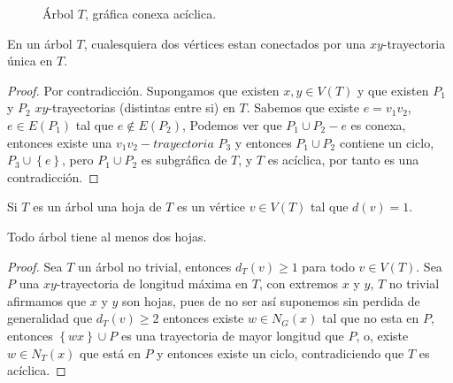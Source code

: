 \begin{figure}[ht]
    \begin{center}
    \end{center}\caption{\'Arbol $T$, gr\'afica conexa ac\'iclica.}
\end{figure}

\begin{teorema}
    \label{ATU}
    En un \'arbol $T$, cualesquiera dos v\'ertices estan conectados por una $xy$-trayectoria \'unica en $T$.
\end{teorema}

\begin{proof}
    Por contradicci\'on.
    Supongamos que existen $x,y \in V(T)$ y que existen $P_1$ y $P_2$ $xy$-trayectorias (distintas entre si) en $T$.
    Sabemos que existe $e= v_1v_2$,  $e \in E(P_1)$ tal que $e \notin E(P_2)$, Podemos ver que $P_1 \cup P_2-e$ es
    conexa, entonces existe una $v_1v_2-trayectoria$ $P_3$ y entonces $P_1 \cup P_2$ contiene un ciclo, $P_3 \cup
    \left\{e\right\}$, pero $P_1 \cup P_2$ es subgr\'afica de $T$, y $T$ es ac\'iclica, por tanto es una
    contradicci\'on.
\end{proof}

Si $T$ es un \'arbol una hoja de $T$ es un v\'ertice $v \in V(T)$ tal que $d(v) = 1$.

\begin{teorema}
    Todo \'arbol tiene al menos dos hojas.
\end{teorema}

\begin{proof}
    Sea $T$ un \'arbol no trivial, entonces $d_T(v) \ge 1$ para todo $v \in V(T)$. Sea $P$ una $xy$-trayectoria de
    longitud m\'axima en $T$, con extremos $x$ y $y$, $T$ no trivial afirmamos que $x$ y $y$ son hojas, pues de no
    ser as\'i suponemos sin perdida de generalidad que $d_T(v) \ge 2$ entonces existe $w \in N_G(x)$ tal que no esta
    en $P$, entonces $\left\{wx\right\} \cup P$ es una trayectoria de mayor longitud que $P$, o, existe $w \in N_T(x)
    $ que est\'a en $P$ y entonces existe un ciclo, contradiciendo que $T$ es ac\'iclica.
\end{proof}

